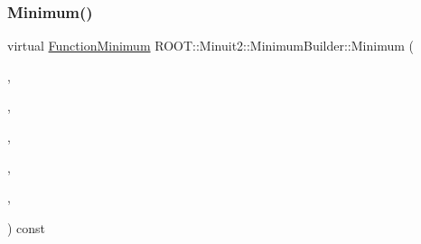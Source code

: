 \subsubsection{\texorpdfstring{Minimum()}{Minimum()}\hspace{0.1cm}{\footnotesize\ttfamily [3/3]}}
{\footnotesize\ttfamily virtual \mbox{\hyperlink{classROOT_1_1Minuit2_1_1FunctionMinimum}{Function\+Minimum}} R\+O\+O\+T\+::\+Minuit2\+::\+Minimum\+Builder\+::\+Minimum (\begin{DoxyParamCaption}\item[{const \mbox{\hyperlink{classROOT_1_1Minuit2_1_1MnFcn}{Mn\+Fcn}} \&}]{,  }\item[{const \mbox{\hyperlink{classROOT_1_1Minuit2_1_1GradientCalculator}{Gradient\+Calculator}} \&}]{,  }\item[{const \mbox{\hyperlink{classROOT_1_1Minuit2_1_1MinimumSeed}{Minimum\+Seed}} \&}]{,  }\item[{const \mbox{\hyperlink{classROOT_1_1Minuit2_1_1MnStrategy}{Mn\+Strategy}} \&}]{,  }\item[{unsigned int}]{,  }\item[{double}]{ }\end{DoxyParamCaption}) const\hspace{0.3cm}{\ttfamily [pure virtual]}}



